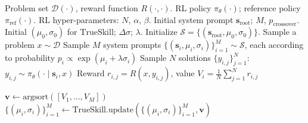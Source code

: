 \documentclass{article}
\theoremstyle{plain}
\theoremstyle{definition}
\theoremstyle{remark}
\begin{document}
\begin{algorithm}[t]
  \caption{Evolutionary System Prompt Learning for RL}
  \label{alg:e-spl}
  \begin{algorithmic}
     Problem set $\mathcal{D}(\cdot)$, reward function $R(\cdot, \cdot)$.
     RL policy $\pi_{\theta}(\cdot)$; reference policy $\pi_{\text{ref}}(\cdot)$.
     RL hyper-parameters: $N$, $\alpha$, $\beta$.
     Initial system prompt $\mathbf{s}_{\text{root}}$; $M$, $p_{\text{crossover}}$.
     Initial $(\mu_{0}, \sigma_{0})$ for {$\mathrm{TrueSkill}$}; $\Delta\sigma$; $\lambda$.
    \STATE Initialize $\mathcal{S} = \{(\mathbf{s}_{\text{root}}, \mu_{0}, \sigma_{0})\}$. \hfill {}
    \STATE Sample a problem $x\sim \mathcal{D}$
    \STATE Sample $M$ system prompts $\{(\mathbf{s}_{i}, \mu_{i}, \sigma_{i})\}_{i=1}^{M} \sim \mathcal{S}$, each according to probability $p_{i} \propto \exp( \mu_{i} + \lambda \sigma_{i} )$
        \STATE Sample $N$ solutions $\{y_{i,j}\}_{j=1}^{N}$: $y_{i, j}\sim \pi_{\theta}(\cdot \mid \mathbf{s}_{i}, x)$
        \STATE Reward $r_{i,j} = R(x, y_{i, j})$, value {$V_{i} = \frac{1}{N} {\sum}_{j=1}^{N} r_{i,j}$} 
    \ENDFOR
     \hfill {}
    \vspace{5pt}
    
    \STATE $\mathbf{v} \leftarrow \mathrm{argsort}([V_{1},\dots, V_{M}])$ \hfill {}
    \STATE $\{(\mu_{i}, \sigma_{i})\}_{i=1}^{M} \leftarrow {\mathrm{TrueSkill}.\mathrm{update}}(\{(\mu_{i}, \sigma_{i})\}_{i=1}^{M}, \mathbf{v})$ \hfill {}
    \vspace{5pt}
    

\end{algorithmic}
\end{algorithm}
\end{document}
